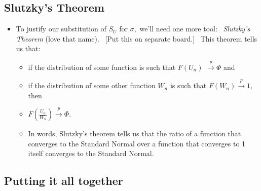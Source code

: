 \documentclass[11pt]{article}
\begin{document}
\subsection{Slutzky's Theorem}

\begin{itemize}
\item To justify our substitution of $S_{U}$ for $\sigma ,$ we'll need one
more tool: \ \textit{Slutzky's Theorem} (love that name). \ [Put this on
separate board.] \ This theorem tells us that:

\begin{itemize}
\item if the distribution of some function is such that $F\left(
U_{n}\right) $ $\overset{p}{\rightarrow }\Phi $ and

\item if the distribution of some other function $W_{n}$ is such that $%
F\left( W_{n}\right) \overset{p}{\rightarrow }1,$ then

\item $F\left( \frac{U_{n}}{W_{n}}\right) \overset{p}{\rightarrow }\Phi .$

\item In words, Slutzky's theorem tells us that the ratio of a function that
converges to the Standard Normal over a function that converges to 1 itself
converges to the Standard Normal.
\end{itemize}
\end{itemize}

\subsection{Putting it all together}
\end{document}
